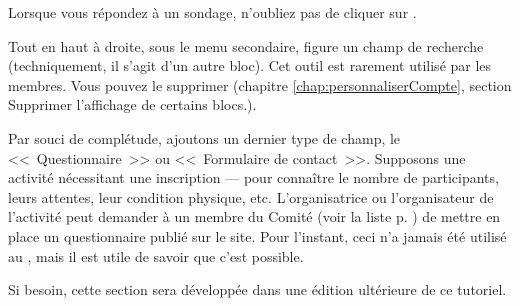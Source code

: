  Lorsque vous répondez à un sondage, n'oubliez pas de cliquer sur .


Tout en haut à droite, sous le menu secondaire, figure un champ de recherche (techniquement, il s’agit d’un autre bloc). Cet outil est rarement utilisé par les membres. Vous pouvez le supprimer (chapitre \ref{chap:personnaliserCompte}, section \og{}Supprimer l'affichage de certains blocs\fg.).


Par souci de complétude, ajoutons un dernier type de champ, le <<~Questionnaire~>> ou <<~Formulaire de contact~>>. Supposons une activité nécessitant une inscription --- pour connaître le nombre de participants, leurs attentes, leur condition physique, etc. L'organisatrice ou l'organisateur de l'activité peut demander à un membre du Comité (voir la liste p. \pageref{sec:comite}) de mettre en place un questionnaire publié sur le site. Pour l'instant, ceci n'a jamais été utilisé au \CdS, mais il est utile de savoir que c'est possible.

Si besoin, cette section sera développée dans une édition ultérieure de ce tutoriel.
